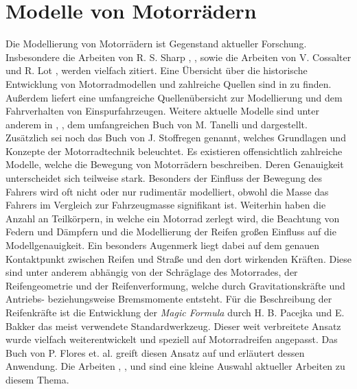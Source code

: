 \chapter{Modelle von Motorr\"adern}\label{ch:modell}
Die Modellierung von Motorr\"adern ist Gegenstand aktueller Forschung. Insbesondere die Arbeiten von R. S. Sharp \cite{Sharp1971}, \cite{SHARP1985}, \cite{Sharp2001} sowie die Arbeiten von V. Cossalter und R. Lot \cite{Cossalter2002}, \cite{Cossalter2010} werden vielfach zitiert. Eine \"Ubersicht \"uber die historische Entwicklung von Motorradmodellen und zahlreiche Quellen sind in \cite{Limebeer2006} zu finden. Au\ss{}erdem liefert \cite{Schwab2013} eine umfangreiche Quellen\"ubersicht zur Modellierung und dem Fahrverhalten von Einspurfahrzeugen. Weitere aktuelle Modelle sind unter anderem in \cite{Kanoh2007}, \cite{Nehaoua2013}, dem umfangreichen Buch von M. Tanelli \cite{MaraTanelli2014a} und \cite{Leonelli2015} dargestellt. Zus\"atzlich sei noch das Buch von J. Stoffregen \cite{Stoffregen2012} genannt, welches Grundlagen und Konzepte der Motorradtechnik beleuchtet.  \hfill \newline
Es existieren offensichtlich zahlreiche Modelle, welche die Bewegung von Motorr\"adern beschreiben. Deren Genauigkeit unterscheidet sich teilweise stark. Besonders der Einfluss der Bewegung des Fahrers wird oft nicht oder nur rudiment\"ar modelliert, obwohl die Masse das Fahrers im Vergleich zur Fahrzeugmasse signifikant ist. Weiterhin haben die Anzahl an Teilk\"orpern, in welche ein Motorrad zerlegt wird, die Beachtung von Federn und D\"ampfern und die Modellierung der Reifen gro\ss{}en Einfluss auf die Modellgenauigkeit. Ein besonders Augenmerk liegt dabei auf dem genauen Kontaktpunkt zwischen Reifen und Stra\ss{}e und den dort wirkenden Kr\"aften. Diese sind unter anderem abh\"angig von der Schr\"aglage des Motorrades, der Reifengeometrie und der Reifenverformung, welche durch Gravitationskr\"afte und Antriebs- beziehungsweise Bremsmomente entsteht. F\"ur die Beschreibung der Reifenkr\"afte ist die Entwicklung der \textit{Magic Formula} durch H. B. Pacejka und E. Bakker \cite{Pacejka1992} das meist verwendete Standardwerkzeug. Dieser weit verbreitete Ansatz wurde vielfach weiterentwickelt und speziell auf Motorradreifen angepasst. Das Buch von P. Flores et. al. \cite{Gent2006} greift diesen Ansatz auf und erl\"autert dessen Anwendung.  Die Arbeiten \cite{Besselink2010}, \cite{Pacejka2012}, \cite{Redrouthu2014} und \cite{Lot2004} sind eine kleine Auswahl aktueller Arbeiten zu diesem Thema. \hfill \newline

